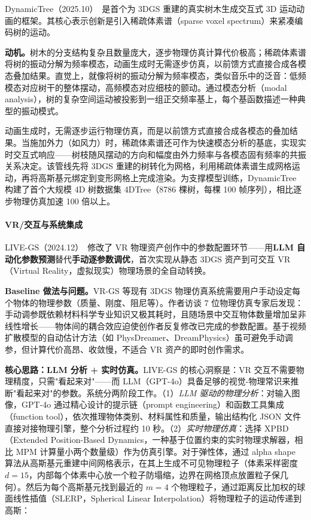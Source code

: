 DynamicTree（2025.10）~\cite{2510_22213}是首个为 3DGS 重建的真实树木生成交互式 3D 运动动画的框架。其核心表示创新是引入稀疏体素谱（sparse voxel spectrum）来紧凑编码树的运动。

\textbf{动机。}树木的分支结构复杂且数量庞大，逐步物理仿真计算代价极高；稀疏体素谱将树的振动分解为频率模态，动画生成时无需逐步仿真，以前馈方式直接合成各模态叠加结果。直觉上，就像将树的振动分解为频率模态，类似音乐中的泛音：低频模态对应树干的整体摆动，高频模态对应细枝的颤动。通过模态分析（modal analysis），树的复杂空间运动被投影到一组正交频率基上，每个基函数描述一种典型的振动模式。

动画生成时，无需逐步运行物理仿真，而是以前馈方式直接合成各模态的叠加结果。当施加外力（如风力）时，稀疏体素谱还可作为快速模态分析的基底，实现实时交互式响应——树枝随风摆动的方向和幅度由外力频率与各模态固有频率的共振关系决定。该管线先将 3DGS 重建的树转化为网格，利用稀疏体素谱生成网格运动，再将高斯基元绑定到变形网格上完成渲染。为支撑模型训练，DynamicTree 构建了首个大规模 4D 树数据集 4DTree（8786 棵树，每棵 100 帧序列），相比逐步物理仿真加速 100 倍以上。

\paragraph{VR/交互与系统集成}

LIVE-GS（2024.12）~\cite{2412_09176}修改了 VR 物理资产创作中的参数配置环节——用\textbf{LLM 自动化参数预测}替代\textbf{手动逐参数调优}，首次实现从静态 3DGS 资产到可交互 VR（Virtual Reality，虚拟现实）物理场景的全自动转换。

\textbf{Baseline 做法与问题。}VR-GS 等现有 3DGS 物理仿真系统需要用户手动设定每个物体的物理参数（质量、刚度、阻尼等）。作者访谈 7 位物理仿真专家后发现：手动调参既依赖材料科学专业知识又极其耗时，且随场景中交互物体数量增加呈非线性增长——物体间的耦合效应迫使创作者反复修改已完成的参数配置。基于视频扩散模型的自动估计方法（如 PhysDreamer、DreamPhysics）虽可避免手动调参，但计算代价高昂、收敛慢，不适合 VR 资产的即时创作需求。

\textbf{核心思路：LLM 分析 + 实时仿真。}LIVE-GS 的核心洞察是：VR 交互不需要物理精度，只需"看起来对"——而 LLM（GPT-4o）具备足够的视觉-物理常识来推断"看起来对"的参数。系统分两阶段工作。（1）\emph{LLM 驱动的物理分析}：对输入图像，GPT-4o 通过精心设计的提示链（prompt engineering）和函数工具集成（function tool），依次推理物体类别、材料属性和质量，输出结构化 JSON 文件直接对接物理引擎，整个分析过程约 10 秒。（2）\emph{实时物理仿真}：选择 XPBD（Extended Position-Based Dynamics，一种基于位置约束的实时物理求解器，相比 MPM 计算量小两个数量级）作为仿真引擎。对于弹性体，通过 alpha shape 算法从高斯基元重建中间网格表示，在其上生成不可见物理粒子（体素采样密度 $d=15$，内部每个体素中心放一个粒子防塌缩，边界在网格顶点放置粒子保几何）。然后为每个高斯基元找到最近的 $m=4$ 个物理粒子，通过距离反比加权的球面线性插值（SLERP，Spherical Linear Interpolation）将物理粒子的运动传递到高斯：

